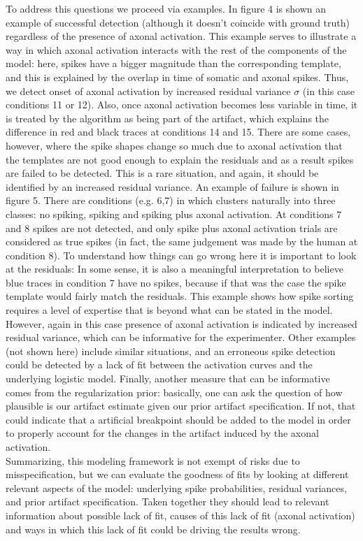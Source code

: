 To address this questions we proceed via examples. In figure 4 is shown an example of successful detection (although it doesn't coincide with ground truth) regardless of the presence of axonal activation. This example serves to illustrate a way in which axonal activation interacts with the rest of the components of the model: here, spikes have a bigger magnitude than the corresponding template, and this is explained by the overlap in time of somatic and axonal spikes. Thus, we detect onset of axonal activation by increased residual variance $\sigma$ (in this case conditions 11 or 12). Also, once axonal activation becomes less variable in time, it is treated by the algorithm as being part of the artifact, which explains the difference in red and black traces at conditions 14 and 15. There are some cases, however, where the spike shapes change so much due to axonal activation that the templates are not good enough to explain the residuals and as a result spikes are failed to be detected. This is a rare situation, and again, it should be identified by an increased residual variance. An example of failure is shown in figure 5. There are conditions (e.g. 6,7) in which clusters naturally into three classes: no spiking, spiking and spiking plus axonal activation. At conditions 7 and 8 spikes are not detected, and only spike plus axonal activation trials are considered as true spikes (in fact, the same judgement was made by the human at condition 8). To understand how things can go wrong here it is important to look at the residuals: In some sense, it is also a meaningful interpretation to believe blue traces in condition 7 have no spikes, because if that was the case the spike template would fairly match the residuals. This example shows how spike sorting requires a level of expertise that is beyond what can be stated in the model. However, again in this case presence of axonal activation is indicated by increased residual variance, which can be informative for the experimenter. Other examples (not shown here) include similar situations, and an erroneous spike detection could be detected by a lack of fit between the activation curves and the underlying logistic model. Finally, another measure that can be informative comes from the regularization prior: basically, one can ask the question of how plausible is our artifact estimate given our prior artifact specification. If not, that could indicate that a artificial breakpoint should be added to the model in order to properly account for the changes in the artifact induced by the axonal activation. 
\\Summarizing, this modeling framework is not exempt of risks due to misspecification, but we can evaluate the goodness of fits by looking at different relevant aspects of the model: underlying spike probabilities, residual variances, and prior artifact specification. Taken together they should lead to relevant information about possible lack of fit, causes of this lack of fit (axonal activation) and ways in which this lack of fit could be driving the results wrong.
